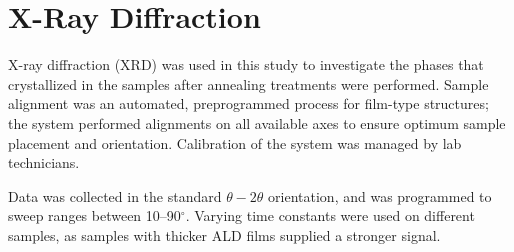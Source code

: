 \section{X-Ray Diffraction}
\label{sec:Methods-XRD}

X-ray diffraction (XRD) was used in this study to investigate the phases that crystallized in the samples after annealing treatments were performed.  Sample alignment was an automated, preprogrammed process for film-type structures; the system performed alignments on all available axes to ensure optimum sample placement and orientation. Calibration of the system was managed by lab technicians. 

Data was collected in the standard $\theta-2\theta$ orientation, and was programmed to sweep ranges between 10--90$^{\circ}$. Varying time constants were used on different samples, as samples with thicker ALD films supplied a stronger signal. 


%





